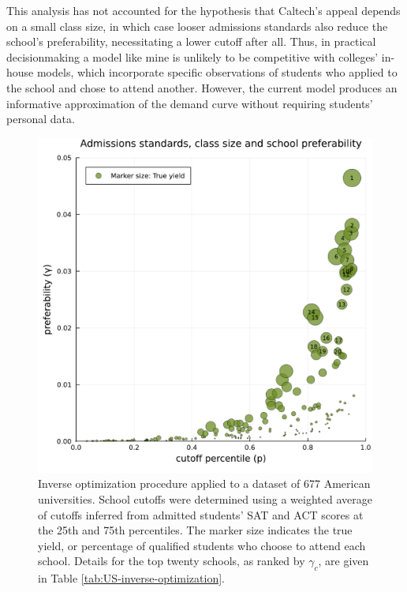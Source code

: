 \documentclass[12pt]{article}
\theoremstyle{definition}
\begin{document}
This analysis has not accounted for the hypothesis that Caltech's appeal depends on a small class size, in which case looser admissions standards also reduce the school's preferability, necessitating a lower cutoff after all. Thus, in practical decisionmaking a model like mine is unlikely to be competitive with colleges' in-house models, which incorporate specific observations of students who applied to the school and chose to attend another. However, the current model produces an informative approximation of the demand curve without requiring students' personal data. %

\begin{figure}
\begin{center}\includegraphics[width=\linewidth, ]{plots/US-cutoff-gamma.pdf}\end{center}
\captionsetup{singlelinecheck=off}
    \caption[.]{Inverse optimization procedure applied to a dataset of 677 American universities. School cutoffs were determined using a weighted average of cutoffs inferred from admitted students' SAT and ACT scores at the 25th and 75th percentiles. The marker size indicates the true yield, or percentage of qualified students who choose to attend each school. Details for the top twenty schools, as ranked by $\gamma_c$, are given in Table \ref{tab:US-inverse-optimization}.}
\label{US-cutoff-gamma}
\end{figure}
\end{document}
